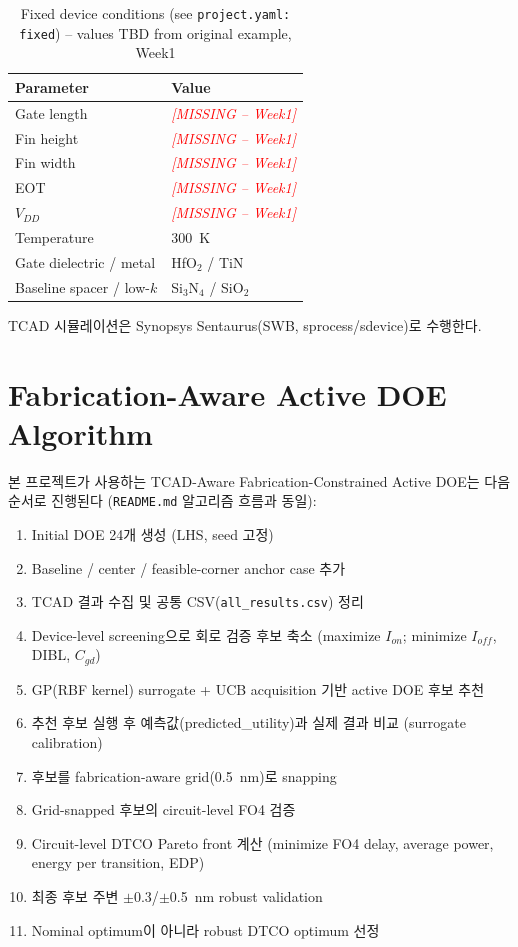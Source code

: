 \documentclass[journal]{IEEEtran}
\newcommand{\missing}[1]{\textcolor{red}{\textit{[MISSING -- #1]}}}
\begin{document}
\begin{table}[t]
\centering
\caption{Fixed device conditions (see \texttt{project.yaml: fixed}) -- values TBD from original example, Week1}
\label{tab:fixed}
\begin{tabular}{@{}ll@{}}
\toprule
Parameter & Value \\
\midrule
Gate length & \missing{Week1} \\
Fin height & \missing{Week1} \\
Fin width & \missing{Week1} \\
EOT & \missing{Week1} \\
$V_{DD}$ & \missing{Week1} \\
Temperature & 300~K \\
Gate dielectric / metal & HfO$_2$ / TiN \\
Baseline spacer / low-$k$ & Si$_3$N$_4$ / SiO$_2$ \\
\bottomrule
\end{tabular}
\end{table}

TCAD 시뮬레이션은 Synopsys Sentaurus(SWB, sprocess/sdevice)로 수행한다.

\section{Fabrication-Aware Active DOE Algorithm}
\label{sec:doe}

본 프로젝트가 사용하는 TCAD-Aware Fabrication-Constrained Active DOE는 다음 순서로 진행된다 (\texttt{README.md} 알고리즘 흐름과 동일):

\begin{enumerate}
  \item Initial DOE 24개 생성 (LHS, seed 고정)
  \item Baseline / center / feasible-corner anchor case 추가
  \item TCAD 결과 수집 및 공통 CSV(\texttt{all\_results.csv}) 정리
  \item Device-level screening으로 회로 검증 후보 축소 (maximize $I_{on}$; minimize $I_{off}$, DIBL, $C_{gd}$)
  \item GP(RBF kernel) surrogate + UCB acquisition 기반 active DOE 후보 추천
  \item 추천 후보 실행 후 예측값(predicted\_utility)과 실제 결과 비교 (surrogate calibration)
  \item 후보를 fabrication-aware grid(0.5~nm)로 snapping
  \item Grid-snapped 후보의 circuit-level FO4 검증
  \item Circuit-level DTCO Pareto front 계산 (minimize FO4 delay, average power, energy per transition, EDP)
  \item 최종 후보 주변 $\pm$0.3/$\pm$0.5~nm robust validation
  \item Nominal optimum이 아니라 robust DTCO optimum 선정
\end{enumerate}
\end{document}
